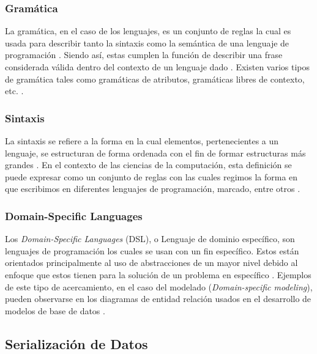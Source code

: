 \subsubsection{Gramática}


La gramática, en el caso de los lenguajes, es un conjunto de reglas la cual es usada para describir tanto la sintaxis como la semántica de una lenguaje de programación \cite{Sebesta2012}. Siendo así, estas cumplen la función de describir una frase considerada válida dentro del contexto de un lenguaje dado \cite[p. 101]{Sipser2012-wl}. Existen varios tipos de gramática tales como gramáticas de atributos, gramáticas libres de contexto, etc. \cite{Sebesta2012}.

\subsubsection{Sintaxis}

La sintaxis se refiere a la forma en la cual elementos, pertenecientes a un lenguaje, se estructuran de forma ordenada con el fin de formar estructuras más grandes \cite{MerriamWebsterSyntax}. En el contexto de las ciencias de la computación, esta definición se puede expresar como un conjunto de reglas con las cuales regimos la forma en que escribimos en diferentes lenguajes de programación, marcado, entre otros \cite[p. 51]{Friedman2008}.

\subsubsection{Domain-Specific Languages} %

Los \textit{Domain-Specific Languages} (DSL), o Lenguaje de dominio específico, son lenguajes de programación los cuales se usan con un fin específico. Estos están orientados principalmente al uso de abstracciones de un mayor nivel debido al enfoque que estos tienen para la solución de un problema en específico \cite{Kelly2008}. Ejemplos de este tipo de acercamiento, en el caso del modelado (\textit{Domain-specific modeling}), pueden observarse en los diagramas de entidad relación usados en el desarrollo de modelos de base de datos \cite{Celikovic2014ADF}. 

\subsection{Serialización de Datos}

